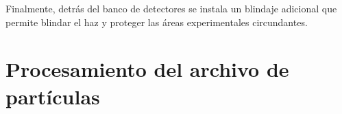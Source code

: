 Finalmente, detrás del banco de detectores se instala un blindaje adicional que permite blindar el haz y proteger las áreas experimentales circundantes.

\section{Procesamiento del archivo de partículas}








